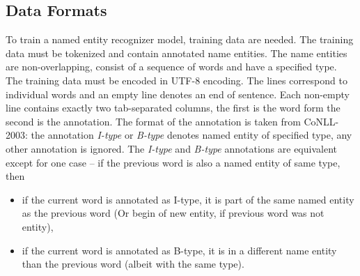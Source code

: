 \subsection{Data Formats}
To train a named entity recognizer model, training data are needed. The training
data must be tokenized and contain annotated name entities. The name entities
are non-overlapping, consist of a sequence of words and have a specified type.
The training data must be encoded in UTF-8 encoding. The lines correspond to
individual words and an empty line denotes an end of sentence. Each non-empty
line contains exactly two tab-separated columns, the first is the word form the
second is the annotation. The format of the annotation is taken from CoNLL-2003:
the annotation {\it I-type} or {\it B-type} denotes named entity of specified
type, any other annotation is ignored. The {\it I-type} and {\it B-type}
annotations are equivalent except for one case – if the previous word is also a
named entity of same type, then
\begin{itemize}
\item{}if the current word is annotated as I-type, it is part of the same named
entity as the previous word (Or begin of new entity, if previous word was not
entity),
\item{}if the current word is annotated as B-type, it is in a different name
entity than the previous word (albeit with the same type).
\end{itemize}

